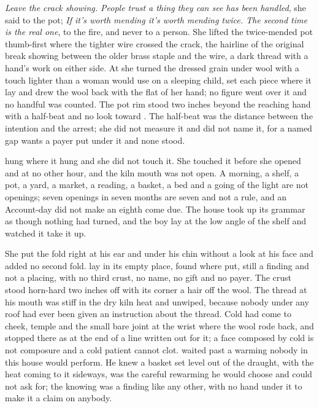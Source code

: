 \emph{Leave the crack showing. People trust a thing they can see has been handled}, she said to the pot; \emph{If it's worth mending it's worth mending twice. The second time is the real one}, to the fire, and never to a person. She lifted the twice-mended pot thumb-first where the tighter wire crossed the crack, the hairline of the original break showing between the older brass staple and the wire, a dark thread with a hand's work on either side. At  she turned the dressed grain under wool with a touch lighter than a woman would use on a sleeping child, set each piece where it lay and drew the wool back with the flat of her hand; no figure went over it and no handful was counted. The pot rim stood two inches beyond the reaching hand with a half-beat and no look toward . The half-beat was the distance between the intention and the arrest; she did not measure it and did not name it, for a named gap wants a payer put under it and none stood.

 hung where it hung and she did not touch it. She touched it before she opened  and at no other hour, and the kiln mouth was not open. A morning, a shelf, a pot, a yard, a market, a reading, a basket, a bed and a going of the light are not openings; seven openings in seven months are seven and not a rule, and an Account-day did not make an eighth come due. The house took up its grammar as though nothing had turned, and the boy lay at the low angle of the shelf and watched it take it up.

She put the fold right at his ear and under his chin without a look at his face and added no second fold.  lay in its empty place, found where put, still a finding and not a placing, with no third crust, no name, no gift and no payer. The crust stood horn-hard two inches off with its corner a hair off the wool. The thread at his mouth was stiff in the dry kiln heat and unwiped, because nobody under any roof had ever been given an instruction about the thread. Cold had come to cheek, temple and the small bare joint at the wrist where the wool rode back, and stopped there as at the end of a line written out for it; a face composed by cold is not composure and a cold patient cannot clot.  waited past a warming nobody in this house would perform. He knew a basket set level out of the draught, with the heat coming to it sideways, was the careful rewarming he would choose and could not ask for; the knowing was a finding like any other, with no hand under it to make it a claim on anybody.

